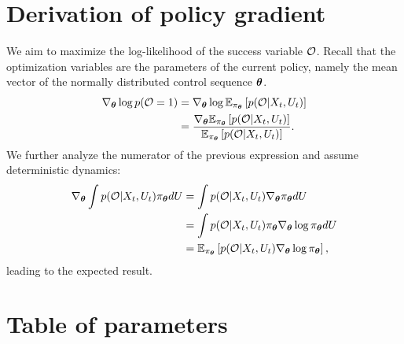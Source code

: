 \section{Derivation of policy gradient}\label{sec:app_derivation_policy_gradient}
We aim to maximize the log-likelihood of the success variable $\mathcal{O}$. Recall that the optimization variables are the parameters of the current policy, namely the mean vector of the normally distributed control sequence $\boldsymbol{\theta}$. 
\begin{align*}
    \nabla_{\boldsymbol{\theta}} \log p(\mathcal{O} = 1) &= \nabla_{\boldsymbol{\theta}} \log \mathbb{E}_{\pi_{\boldsymbol{\theta}}} \left [p(\mathcal{O} | X_t, U_t)\right] \\
    &= \frac{\nabla_{\boldsymbol{\theta}} \mathbb{E}_{\pi_{\boldsymbol{\theta}}} \left [p(\mathcal{O} | X_t, U_t)\right]}{\mathbb{E}_{\pi_{\boldsymbol{\theta}}} \left [p(\mathcal{O} | X_t, U_t)\right]}.
\end{align*}
We further analyze the numerator of the previous expression and assume deterministic dynamics:
\begin{align*}
    \nabla_{\boldsymbol{\theta}} \int p(\mathcal{O} | X_t, U_t) \pi_{\boldsymbol{\theta}} dU &= \int p(\mathcal{O} | X_t, U_t) \nabla_{\boldsymbol{\theta}} \pi_{\boldsymbol{\theta}} dU \\
    &= \int p(\mathcal{O} | X_t, U_t) \pi_{\boldsymbol{\theta}} \nabla_{\boldsymbol{\theta}} \log \pi_{\boldsymbol{\theta}} dU \\
    &= \mathbb{E}_{\pi_{\boldsymbol{\theta}}} \left [p(\mathcal{O} | X_t, U_t) \nabla_{\boldsymbol{\theta}} \log \pi_{\boldsymbol{\theta}}\right],
\end{align*}
leading to the expected result. 


\section{Table of parameters}\label{sec:app_table_of_parameters}
